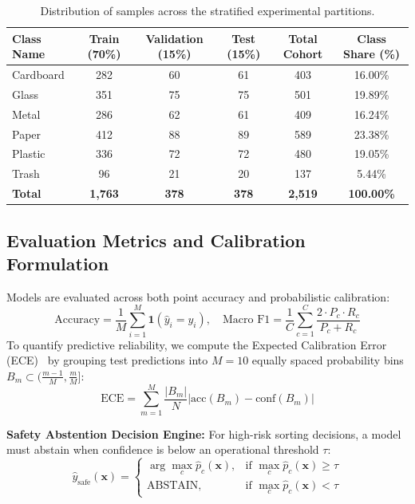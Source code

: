 \documentclass[11pt,a4paper]{article}
\begin{document}
\begin{table}[h!]
\centering
\caption{Distribution of samples across the stratified experimental partitions.}
\label{tab:split_counts}
\begin{tabular}{lccccc}
\toprule
\textbf{Class Name} & \textbf{Train (70\%)} & \textbf{Validation (15\%)} & \textbf{Test (15\%)} & \textbf{Total Cohort} & \textbf{Class Share (\%)} \\
\midrule
Cardboard & 282 & 60 & 61 & 403 & 16.00\% \\
Glass     & 351 & 75 & 75 & 501 & 19.89\% \\
Metal     & 286 & 62 & 61 & 409 & 16.24\% \\
Paper     & 412 & 88 & 89 & 589 & 23.38\% \\
Plastic   & 336 & 72 & 72 & 480 & 19.05\% \\
Trash     & 96  & 21 & 20 & 137 & 5.44\% \\
\midrule
\textbf{Total} & \textbf{1,763} & \textbf{378} & \textbf{378} & \textbf{2,519} & \textbf{100.00\%} \\
\bottomrule
\end{tabular}
\end{table}

\subsection{Evaluation Metrics and Calibration Formulation}
Models are evaluated across both point accuracy and probabilistic calibration:
\begin{equation}
    \text{Accuracy} = \frac{1}{M} \sum_{i=1}^M \mathbf{1}(\hat{y}_i = y_i), \quad \text{Macro F1} = \frac{1}{C} \sum_{c=1}^C \frac{2 \cdot P_c \cdot R_c}{P_c + R_c}
\end{equation}
\noindent To quantify predictive reliability, we compute the Expected Calibration Error (ECE)~\cite{guo2017calibration} by grouping test predictions into $M=10$ equally spaced probability bins $B_m \subset ( \frac{m-1}{M}, \frac{m}{M} ]$:
\begin{equation}
    \text{ECE} = \sum_{m=1}^M \frac{|B_m|}{N} \left| \text{acc}(B_m) - \text{conf}(B_m) \right|
\end{equation}

\noindent\textbf{Safety Abstention Decision Engine:} For high-risk sorting decisions, a model must abstain when confidence is below an operational threshold $\tau$:
\begin{equation}
    \hat{y}_{\text{safe}}(\mathbf{x}) = \begin{cases} \arg\max_{c} \hat{p}_c(\mathbf{x}), & \text{if } \max_c \hat{p}_c(\mathbf{x}) \ge \tau \\ \text{ABSTAIN}, & \text{if } \max_c \hat{p}_c(\mathbf{x}) < \tau \end{cases}
\end{equation}
\end{document}
